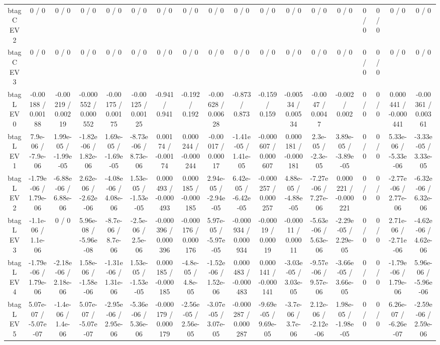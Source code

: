 \documentclass[10pt]{article}
\begin{document}
\begin{table}[htbp]
\begin{center}
\begin{tabular}{|c|c|c|c|c|c|c|c|c|c|c|c|c|c|c|c|c|c|}
  btag C EV 2 & 0 / 0 & 0 / 0 & 0 / 0 & 0 / 0 & 0 / 0 & 0 / 0 & 0 / 0 & 0 / 0 & 0 / 0 & 0 / 0 & 0 / 0 & 0 / 0 & 0 / 0 & 0 / 0 & 0 / 0 & 0 / 0 & 0 / 0 \\ 
  btag C EV 3 & 0 / 0 & 0 / 0 & 0 / 0 & 0 / 0 & 0 / 0 & 0 / 0 & 0 / 0 & 0 / 0 & 0 / 0 & 0 / 0 & 0 / 0 & 0 / 0 & 0 / 0 & 0 / 0 & 0 / 0 & 0 / 0 & 0 / 0 \\ 
  btag L EV 0 & -0.00188 / 0.00188 & -0.00219 / 0.00219 & -0.000552 / 0.000552 & -0.00175 / 0.00175 & -0.00125 / 0.00125 & -0.941 / 0.941 & -0.192 / 0.192 & -0.00628 / 0.00628 & -0.873 / 0.873 & -0.159 / 0.159 & -0.00534 / 0.00534 & -0.0047 / 0.0047 & -0.002 / 0.002 & 0 / 0 & 0 / 0 & 0.000441 / -0.000441 & -0.00361 / 0.00361 \\ 
  btag L EV 1 & 7.9e-06 / -7.9e-06 & 1.99e-05 / -1.99e-05 & -1.82e-06 / 1.82e-06 & 1.69e-05 / -1.69e-05 & -8.73e-06 / 8.73e-06 & 0.00174 / -0.00174 & 0.000244 / -0.000244 & -0.00017 / 0.00017 & -1.41e-05 / 1.41e-05 & -0.000607 / 0.000607 & 0.000181 / -0.000181 & 2.3e-05 / -2.3e-05 & 3.89e-05 / -3.89e-05 & 0 / 0 & 0 / 0 & 5.33e-06 / -5.33e-06 & -3.33e-05 / 3.33e-05 \\ 
  btag L EV 2 & -1.79e-06 / 1.79e-06 & -6.88e-06 / 6.88e-06 & 2.62e-06 / -2.62e-06 & -4.08e-06 / 4.08e-06 & 1.53e-05 / -1.53e-05 & 0.000493 / -0.000493 & 0.000185 / -0.000185 & 2.94e-05 / -2.94e-05 & 6.42e-05 / -6.42e-05 & -0.000257 / 0.000257 & 4.88e-05 / -4.88e-05 & -7.27e-06 / 7.27e-06 & 0.000221 / -0.000221 & 0 / 0 & 0 / 0 & -2.77e-06 / 2.77e-06 & -6.32e-06 / 6.32e-06 \\ 
  btag L EV 3 & -1.1e-06 / 1.1e-06 & 0 / 0 & 5.96e-08 / -5.96e-08 & -8.7e-06 / 8.7e-06 & -2.5e-06 / 2.5e-06 & -0.000396 / 0.000396 & -0.000176 / 0.000176 & 5.97e-05 / -5.97e-05 & -0.000934 / 0.000934 & -0.00019 / 0.00019 & -0.00011 / 0.00011 & -5.63e-06 / 5.63e-06 & -2.29e-05 / 2.29e-05 & 0 / 0 & 0 / 0 & 2.71e-06 / -2.71e-06 & -4.62e-06 / 4.62e-06 \\ 
  btag L EV 4 & -1.79e-06 / 1.79e-06 & -2.18e-06 / 2.18e-06 & 1.58e-06 / -1.58e-06 & -1.31e-06 / 1.31e-06 & 1.53e-05 / -1.53e-05 & 0.000185 / -0.000185 & -4.8e-05 / 4.8e-05 & -1.52e-06 / 1.52e-06 & 0.000483 / -0.000483 & 0.000141 / -0.000141 & -3.03e-05 / 3.03e-05 & -9.57e-06 / 9.57e-06 & -3.66e-05 / 3.66e-05 & 0 / 0 & 0 / 0 & -1.79e-06 / 1.79e-06 & 5.96e-06 / -5.96e-06 \\ 
  btag L EV 5 & 5.07e-07 / -5.07e-07 & -1.4e-06 / 1.4e-06 & 5.07e-07 / -5.07e-07 & -2.95e-06 / 2.95e-06 & -5.36e-06 / 5.36e-06 & -0.000179 / 0.000179 & -2.56e-05 / 2.56e-05 & -3.07e-05 / 3.07e-05 & -0.000287 / 0.000287 & -9.69e-05 / 9.69e-05 & -3.7e-06 / 3.7e-06 & 2.12e-06 / -2.12e-06 & 1.98e-05 / -1.98e-05 & 0 / 0 & 0 / 0 & 6.26e-07 / -6.26e-07 & -2.59e-06 / 2.59e-06 \\ 

\end{tabular}
\end{center}
\end{table}
\end{document}
